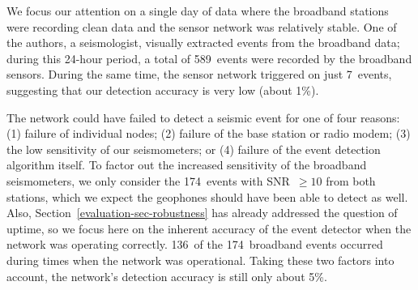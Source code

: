 We focus our attention on a single day of data where the broadband stations
were recording clean data and the sensor network was relatively stable. One
of the authors, a seismologist, visually extracted events from the broadband
data; during this 24-hour period, a total of 589~events were recorded by the
broadband sensors. During the same time, the sensor network triggered on just
7~events, suggesting that our detection accuracy is very low (about 1\%).

The network could have failed to detect a seismic event for one of four
reasons: (1) failure of individual nodes; (2) failure of the base station or
radio modem; (3) the low sensitivity of our seismometers; or (4) failure of
the event detection algorithm itself. To factor out the increased sensitivity
of the broadband seismometers, we only consider the 174~events with SNR~$\geq
10$ from both stations, which we expect the geophones should have been able
to detect as well.  Also, Section~\ref{evaluation-sec-robustness} has already
addressed the question of uptime, so we focus here on the inherent accuracy
of the event detector when the network was operating correctly. 136~of the
174~broadband events occurred during times when the network was operational.
Taking these two factors into account, the network's detection accuracy is
still only about 5\%. 



